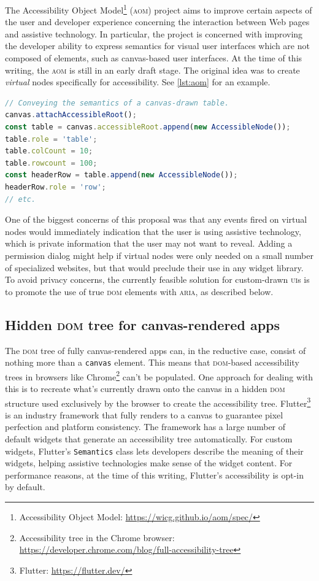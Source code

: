 \documentclass[sigconf]{acmart}
\begin{document}
The Accessibility Object Model\footnote{Accessibility Object Model: \url{https://wicg.github.io/aom/spec/}} (\textsc{aom}) project aims to improve certain aspects of the user and developer experience concerning the interaction between Web pages and assistive technology. In particular, the project is concerned with improving the developer ability to express semantics for visual user interfaces which are not composed of elements, such as canvas-based user interfaces. At the time of this writing, the \textsc{aom} is still in an early draft stage. The original idea was to create \textit{virtual} nodes specifically for accessibility. See \autoref{lst:aom} for an example.

\begin{lstlisting}[language=JavaScript, style=ES6, label={lst:aom}, caption={The now retracted \texttt{AccessibleNode} \textsc{api} of the Accessibility Object Model.}]
// Conveying the semantics of a canvas-drawn table.
canvas.attachAccessibleRoot();
const table = canvas.accessibleRoot.append(new AccessibleNode());
table.role = 'table';
table.colCount = 10;
table.rowcount = 100;
const headerRow = table.append(new AccessibleNode());
headerRow.role = 'row';
// etc. 
\end{lstlisting}

One of the biggest concerns of this proposal was that any events fired on virtual nodes would immediately indication that the user is using assistive technology, which is private information that the user may not want to reveal. Adding a permission dialog might help if virtual nodes were only needed on a small number of specialized websites, but that would preclude their use in any widget library. To avoid privacy concerns, the currently feasible solution for custom-drawn \textsc{ui}s is to promote the use of true \textsc{dom} elements with \textsc{aria}, as described below.

\subsection{Hidden \textsc{dom} tree for canvas-rendered apps}

 The \textsc{dom} tree of fully canvas-rendered apps can, in the reductive case, consist of nothing more than a \texttt{canvas} element. This means that \textsc{dom}-based accessibility trees in browsers like Chrome\footnote{Accessibility tree in the Chrome browser: \url{https://developer.chrome.com/blog/full-accessibility-tree}} can't be populated. One approach for dealing with this is to recreate what's currently drawn onto the canvas in a hidden \textsc{dom} structure used exclusively by the browser to create the accessibility tree. Flutter\footnote{Flutter: \url{https://flutter.dev/}} is an industry framework that fully renders to a canvas to guarantee pixel perfection and platform consistency. The framework has a large number of default widgets that generate an accessibility tree automatically. For custom widgets, Flutter's \texttt{Semantics} class lets developers describe the meaning of their widgets, helping assistive technologies make sense of the widget content. For performance reasons, at the time of this writing, Flutter's accessibility is opt-in by default.
 
\end{document}
